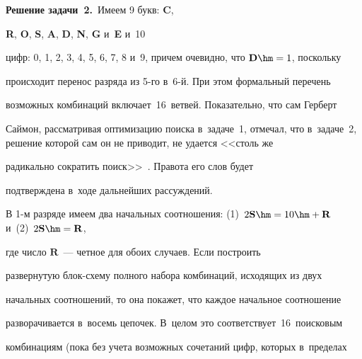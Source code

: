  


 


 \renewcommand{\figurename}{\protect\bf Рис.}


\renewcommand{\tablename}{\protect\bf Таблица}


\setcounter{table}{1}





    


    \smallskip


    


    \textbf{Решение задачи~2.}\ Имеем 9 букв: \textbf{C}, 


    \textbf{R}, \textbf{O}, \textbf{S}, \textbf{A}, \textbf{D}, \textbf{N}, \textbf{G} и~\textbf{E} и~10 


цифр: 0, 1, 2, 3, 4, 5, 6, 7, 8 и~9, причем очевидно, что $\mathbf{D} \hm= 1$, поскольку 


происходит перенос разряда из 5-го в~6-й. При этом формальный перечень 


возможных комбинаций включает~16~ветвей. Показательно, что сам Герберт 


Саймон, рассматривая оптимизацию поиска в~задаче~1, отмечал, что в~задаче~2, решение которой сам он не приводит, не удается <<столь же 


радикально сократить поиск>>~\cite[с.~41]{7-kor}. Правота его слов будет 


подтверждена в~ходе дальнейших рас\-суж\-де\-ний. 


{





}


    


    {В 1-м разряде} имеем два начальных соотношения: (1)~$ 2\mathbf{S}\hm = 10 \hm+ \mathbf{R}$ и~(2)~$ 2\mathbf{S}\hm = \mathbf{R}$, 


где число $\mathbf{R}$~--- четное для обоих случаев. Если построить 


развернутую блок-схему полного набора комбинаций, исходящих из двух 


начальных соотношений, то она покажет, что каждое начальное соотношение 


разворачивается в~восемь цепочек. В~целом это соответствует~16~поисковым 


комбинациям (пока без учета возможных сочетаний цифр, которых в~пределах 


